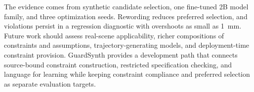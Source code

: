 The evidence comes from synthetic candidate selection, one fine-tuned 2B model
family, and three optimization seeds. Rewording reduces preferred selection,
and violations persist in a regression diagnostic with overshoots as small as
1~mm. Future work should assess real-scene applicability, richer compositions of
constraints and assumptions, trajectory-generating models, and deployment-time
constraint provision. GuardSynth provides a development path that connects
source-bound constraint construction, restricted specification checking, and language
for learning while keeping constraint compliance and preferred selection as
separate evaluation targets.
